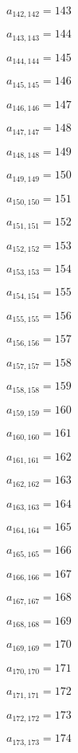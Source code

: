 \documentclass[a4paper,12pt]{article}
\begin{document}
$a _{ 142, 142 } = 143$

$a _{ 143, 143 } = 144$

$a _{ 144, 144 } = 145$

$a _{ 145, 145 } = 146$

$a _{ 146, 146 } = 147$

$a _{ 147, 147 } = 148$

$a _{ 148, 148 } = 149$

$a _{ 149, 149 } = 150$

$a _{ 150, 150 } = 151$

$a _{ 151, 151 } = 152$

$a _{ 152, 152 } = 153$

$a _{ 153, 153 } = 154$

$a _{ 154, 154 } = 155$

$a _{ 155, 155 } = 156$

$a _{ 156, 156 } = 157$

$a _{ 157, 157 } = 158$

$a _{ 158, 158 } = 159$

$a _{ 159, 159 } = 160$

$a _{ 160, 160 } = 161$

$a _{ 161, 161 } = 162$

$a _{ 162, 162 } = 163$

$a _{ 163, 163 } = 164$

$a _{ 164, 164 } = 165$

$a _{ 165, 165 } = 166$

$a _{ 166, 166 } = 167$

$a _{ 167, 167 } = 168$

$a _{ 168, 168 } = 169$

$a _{ 169, 169 } = 170$

$a _{ 170, 170 } = 171$

$a _{ 171, 171 } = 172$

$a _{ 172, 172 } = 173$

$a _{ 173, 173 } = 174$
\end{document}
